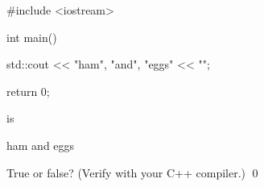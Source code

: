 \begin{console}
#include <iostream>

int main()
{
    std::cout << "ham", "and", "eggs"
              << "\n";
      
    return 0;
}
\end{console}
is
\begin{console}
ham and eggs
\end{console}
True or false? (Verify with your C++ compiler.)
\qed
